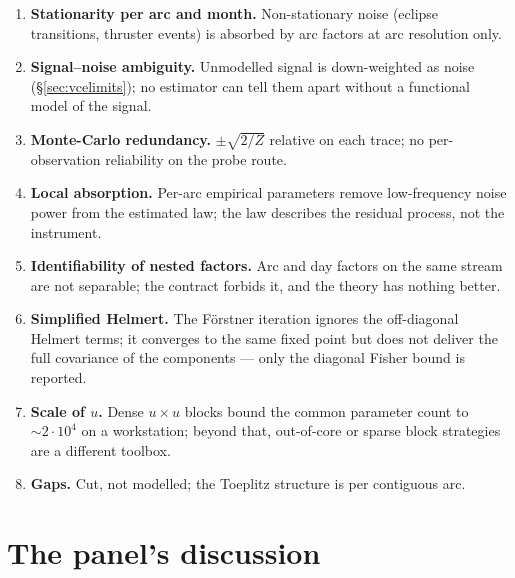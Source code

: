 \begin{enumerate}
\item \textbf{Stationarity per arc and month.} Non-stationary noise (eclipse transitions, thruster events) is absorbed by arc factors at arc resolution only.
\item \textbf{Signal--noise ambiguity.} Unmodelled signal is down-weighted as noise (\S\ref{sec:vcelimits}); no estimator can tell them apart without a functional model of the signal.
\item \textbf{Monte-Carlo redundancy.} $\pm\sqrt{2/Z}$ relative on each trace; no per-observation reliability on the probe route.
\item \textbf{Local absorption.} Per-arc empirical parameters remove low-frequency noise power from the estimated law; the law describes the residual process, not the instrument.
\item \textbf{Identifiability of nested factors.} Arc and day factors on the same stream are not separable; the contract forbids it, and the theory has nothing better.
\item \textbf{Simplified Helmert.} The Förstner iteration ignores the off-diagonal Helmert terms; it converges to the same fixed point but does not deliver the full covariance of the components --- only the diagonal Fisher bound is reported.
\item \textbf{Scale of $u$.} Dense $u\times u$ blocks bound the common parameter count to $\sim 2\cdot10^4$ on a workstation; beyond that, out-of-core or sparse block strategies are a different toolbox.
\item \textbf{Gaps.} Cut, not modelled; the Toeplitz structure is per contiguous arc.
\end{enumerate}

\chapter{The panel's discussion}
\label{ch:discussion}

